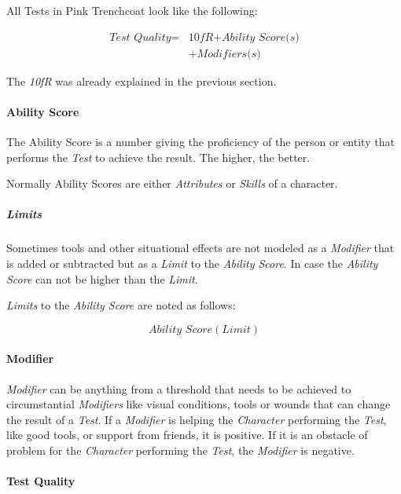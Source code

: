 All Tests in Pink Trenchcoat look like the following:

\begin{equation}
    \begin{split}
        \textit{Test Quality} = {} & \textit{10fR}  + \textit{Ability Score(s)} \\
        & + \textit{Modifiers(s)}
    \end{split}
\end{equation}


The \emph{10fR} was already explained in the previous section.

\paragraph{Ability Score}

The Ability Score is a number giving the proficiency of the person or entity that
performs the \emph{Test} to achieve the result. The higher, the better.

Normally Ability Scores are either \emph{Attributes} or \emph{Skills} of a character.

\subparagraph{Limits}

Sometimes tools and other situational effects are not modeled as a \emph{Modifier}
that is added or subtracted but as a \emph{Limit} to the \emph{Ability Score}. In
case the \emph{Ability Score} can not be higher than the \emph{Limit}.

\emph{Limits} to the \emph{Ability Score} are noted as follows:

\begin{equation}
    \textit{Ability Score}(\textit{Limit})
\end{equation}

\paragraph{Modifier}

\emph{Modifier} can be anything from a threshold that needs to be achieved to
circumstantial \emph{Modifiers} like visual conditions, tools or wounds that can
change the result of a \emph{Test}. If a \emph{Modifier} is helping the
\emph{Character} performing the \emph{Test}, like good tools, or support from friends,
it is positive. If it is an obstacle of problem for the \emph{Character} performing
the \emph{Test}, the \emph{Modifier} is negative.

\paragraph{Test Quality}

